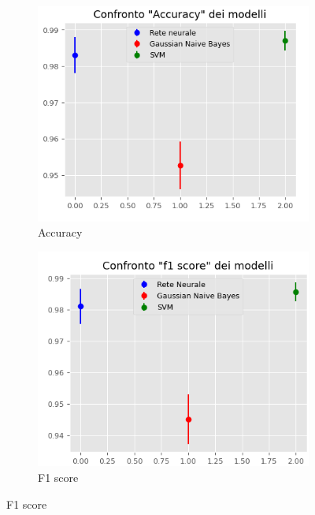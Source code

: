\begin{figure}[!ht]
    \centering
    \begin{subfigure}[b]{0.4\textwidth}
        \centering
        \includegraphics[width=\textwidth]{img/ris/accuracy_inter_corr.png}
        \caption{Accuracy}
        \label{fig:acc}
    \end{subfigure}
    \hfill
    \begin{subfigure}[b]{0.4\textwidth}
        \centering
        \includegraphics[width=\textwidth]{img/ris/fscore_inter_corr.png}
        \caption{F1 score}
        \label{fig:f1}
    \end{subfigure}

\end{figure}
